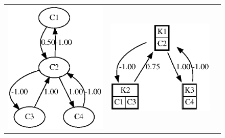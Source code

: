 \documentclass[graybox]{svmult}
\begin{document}
\begin{center}
  \begin{figure}
    \setlength\tabcolsep{.2cm}
    \begin{tabular}{p{}p{}p{}}
      \includegraphics[width=\linewidth]{original.eps} &
      \includegraphics[width=\linewidth]{kClustered.eps} &

\end{tabular}
\end{figure}
\end{center}
\end{document}
